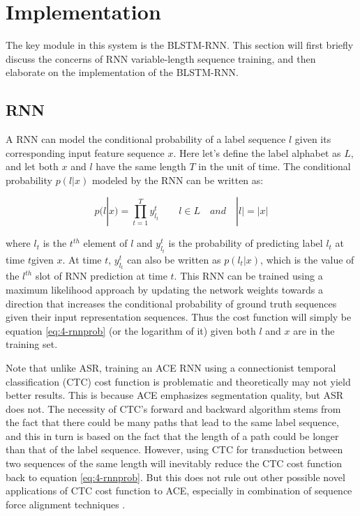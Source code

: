 \section{Implementation}\label{sec:4-blstm}
The key module in this system is the BLSTM-RNN. This section will first briefly discuss the concerns of RNN variable-length sequence training, and then elaborate on the implementation of the BLSTM-RNN.

\subsection{RNN}
A RNN can model the conditional probability of a label sequence $l$ given its corresponding input feature sequence $x$. Here let's define the label alphabet as $L$, and let both $x$ and $l$ have the same length $T$ in the unit of time. The conditional probability $p(l|x)$ modeled by the RNN can be written as:

\begin{equation}\label{eq:4-rnnprob}
p(l|x) = \prod_{t=1}^T y_{l_t}^t  \quad\quad l\in L \quad and \quad |l| = |x|
\end{equation}

where $l_t$ is the $t^{th}$ element of $l$ and $y_{l_t}^t$ is the probability of predicting label $l_t$ at time $t $given $x$. At time $t$, $y_{l_t}^t$ can also be written as $p(l_t|x)$, which is the value of the $l^{th}$ slot of RNN prediction at time $t$. This RNN can be trained using a maximum likelihood approach by updating the network weights towards a direction that increases the conditional probability of ground truth sequences given their input representation sequences. Thus the cost function will simply be equation \ref{eq:4-rnnprob} (or the logarithm of it) given both $l$ and $x$ are in the training set.

Note that unlike ASR, training an ACE RNN using a connectionist temporal classification (CTC) cost function \cite{graves2006connectionist} is problematic and theoretically may not yield better results. This is because ACE emphasizes segmentation quality, but ASR does not. The necessity of CTC's forward and backward algorithm stems from the fact that there could be many paths that lead to the same label sequence, and this in turn is based on the fact that the length of a path could be longer than that of the label sequence. However, using CTC for transduction between two sequences of the same length will inevitably reduce the CTC cost function back to equation \ref{eq:4-rnnprob}. But this does not rule out other possible novel applications of CTC cost function to ACE, especially in combination of sequence force alignment techniques \cite{sheh2003chord,mauch2010lyrics}.

